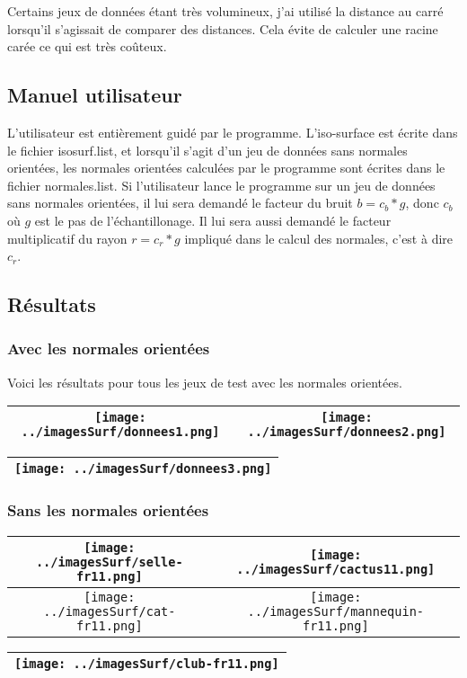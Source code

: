 \documentclass[11pt,a4paper]{article}
\begin{document}
Certains jeux de données étant très volumineux, j'ai utilisé la distance au carré lorsqu'il s'agissait de comparer des distances. Cela évite de calculer une
racine carée ce qui est très coûteux.

\subsection{Manuel utilisateur}
L'utilisateur est entièrement guidé par le programme. L'iso-surface est écrite dans le fichier isosurf.list, et lorsqu'il s'agit
d'un jeu de données sans normales orientées, les normales orientées calculées par le programme sont écrites dans le fichier normales.list.
Si l'utilisateur lance le programme sur un jeu de données sans normales orientées, il lui sera demandé le facteur du bruit $b=c_b*g$, donc
$c_b$ où $g$ est le pas de l'échantillonage. Il lui sera aussi demandé le facteur multiplicatif du rayon $r=c_r*g$ impliqué dans le calcul des normales,
c'est à dire $c_r$.

\pagebreak

\subsection{Résultats}
\subsubsection{Avec les normales orientées}
Voici les résultats pour tous les jeux de test avec les normales orientées.

\begin{center}
\begin{tabular}{|c|c|}
\hline
\texttt{[image: ../imagesSurf/donnees1.png]} & \texttt{[image: ../imagesSurf/donnees2.png]}\\
\hline
\end{tabular}
\begin{tabular}{|c|}
\texttt{[image: ../imagesSurf/donnees3.png]}\\
\hline
\end{tabular}
\end{center}

\pagebreak

\subsubsection{Sans les normales orientées}
\begin{center}
\begin{tabular}{|c|c|}
\hline
\texttt{[image: ../imagesSurf/selle-fr11.png]} & \texttt{[image: ../imagesSurf/cactus11.png]}\\
\hline
\texttt{[image: ../imagesSurf/cat-fr11.png]}   & \texttt{[image: ../imagesSurf/mannequin-fr11.png]}\\
\hline
\end{tabular}
\begin{tabular}{|c|}
\hline
\texttt{[image: ../imagesSurf/club-fr11.png]}\\
\hline
\end{tabular}
\end{center}
\end{document}

